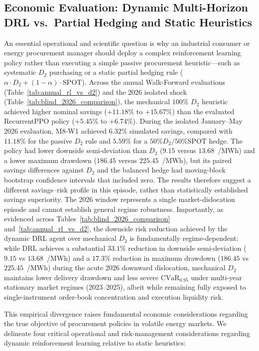 \subsection{Economic Evaluation: Dynamic Multi-Horizon DRL vs.\ Partial Hedging and Static Heuristics}
\label{subsec:economic_evaluation}

An essential operational and scientific question is why an industrial consumer or energy procurement manager should deploy a complex reinforcement learning policy rather than executing a simple passive procurement heuristic---such as systematic $D_2$ purchasing or a static partial hedging rule ($\alpha \cdot D_2 + (1-\alpha) \cdot \text{SPOT}$). Across the annual Walk-Forward evaluations (Table~\ref{tab:annual_rl_vs_d2}) and the 2026 isolated shock (Table~\ref{tab:blind_2026_comparison}), the mechanical $100\%$ $D_2$ heuristic achieved higher nominal savings ($+11.18\%$ to $+15.67\%$) than the evaluated RecurrentPPO policy ($+5.45\%$ to $+6.74\%$). During the isolated January--May 2026 evaluation, M8-W1 achieved $6.32\%$ simulated savings, compared with $11.18\%$ for the passive $D_2$ rule and $5.59\%$ for a $50\% D_2 / 50\% \text{SPOT}$ hedge. The policy had lower downside semi-deviation than $D_2$ ($9.15$ versus $13.68$~\texteuro/MWh) and a lower maximum drawdown ($186.45$ versus $225.45$~\texteuro/MWh), but its paired savings differences against $D_2$ and the balanced hedge had moving-block bootstrap confidence intervals that included zero. The results therefore suggest a different savings--risk profile in this episode, rather than statistically established savings superiority. The 2026 window represents a single market-dislocation episode and cannot establish general regime robustness. Importantly, as evidenced across Tables~\ref{tab:blind_2026_comparison} and~\ref{tab:annual_rl_vs_d2}, the downside risk reduction achieved by the dynamic DRL agent over mechanical $D_2$ is fundamentally regime-dependent: while DRL achieves a substantial $33.1\%$ reduction in downside semi-deviation ($9.15$ vs $13.68$~\texteuro/MWh) and a $17.3\%$ reduction in maximum drawdown ($186.45$ vs $225.45$~\texteuro/MWh) during the acute 2026 downward dislocation, mechanical $D_2$ maintains lower delivery drawdown and less severe $\text{CVaR}_{0.95}$ under multi-year stationary market regimes (2023--2025), albeit while remaining fully exposed to single-instrument order-book concentration and execution liquidity risk.

This empirical divergence raises fundamental economic considerations regarding the true objective of procurement policies in volatile energy markets. We delineate four critical operational and risk-management considerations regarding dynamic reinforcement learning relative to static heuristics:

